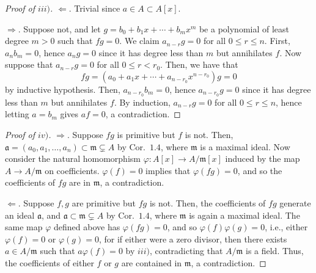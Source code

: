 \documentclass[12pt,letterpaper]{article}
\theoremstyle{definition}
\theoremstyle{remark}
\numberwithin{figure}{problem}
\numberwithin{equation}{section}
\begin{document}
\begin{proof}[Proof of $iii)$]
  $\Leftarrow$. Trivial since $a \in A \subset A[x]$.
  \par $\Rightarrow$. Suppose not, and let $g = b_0 + b_1x + \cdots + b_mx^m$
  be a polynomial of least degree $m > 0$ such that $fg = 0$.
  We claim $a_{n-r}g = 0$ for all $0 \le r \le n$.
  First, $a_nb_m=0$, hence $a_ng = 0$ since it has degree less than $m$ but
  annihilates $f$. Now suppose that $a_{n-r}g = 0$ for all $0 \le r < r_0$.
  Then, we have that
  \begin{equation*}
    fg = \left(a_0 + a_1x + \cdots + a_{n-r_0}x^{n-r_0}\right)g = 0
  \end{equation*}
  by inductive hypothesis.
  Then, $a_{n-r_0}b_m = 0$, hence $a_{n-r_0}g = 0$ since it has degree less than $m$ 
  but annihilates $f$.
  By induction, $a_{n-r}g = 0$ for all $0 \le r \le n$, hence letting $a = b_m$
  gives $af = 0$, a contradiction.
\end{proof}
\begin{proof}[Proof of $iv)$]
  $\Rightarrow$. Suppose $fg$ is primitive but $f$ is not.
  Then, $\mathfrak{a} = (a_0,a_1,\ldots,a_n) \subset \mathfrak{m} \subsetneq A$
  by Cor.~$1.4$, where $\mathfrak{m}$ is a maximal ideal.
  Now consider the natural homomorphism $\varphi\colon A[x] \to A/\mathfrak{m}[x]$
  induced by the map $A \to A/\mathfrak{m}$ on coefficients.
  $\varphi(f) = 0$ implies that $\varphi(fg) = 0$, and so the coefficients of $fg$
  are in $\mathfrak{m}$, a contradiction.
  \par $\Leftarrow$. Suppose $f,g$ are primitive but $fg$ is not.
  Then, the coefficients of $fg$ generate an ideal $\mathfrak{a}$, and
  $\mathfrak{a} \subset \mathfrak{m} \subsetneq A$ by Cor.~$1.4$, where
  $\mathfrak{m}$ is again a maximal ideal.
  The same map $\varphi$ defined above has $\varphi(fg) = 0$, and so
  $\varphi(f)\varphi(g) = 0$, i.e., either $\varphi(f) = 0$ or $\varphi(g) = 0$,
  for if either were a zero divisor, then there exists $a \in A/\mathfrak{m}$ such
  that $a\varphi(f) = 0$ by $iii)$, contradicting that $A/\mathfrak{m}$ is a field.
  Thus, the coefficients of either $f$ or $g$ are contained in $\mathfrak{m}$,
  a contradiction. 
\end{proof}
\end{document}
